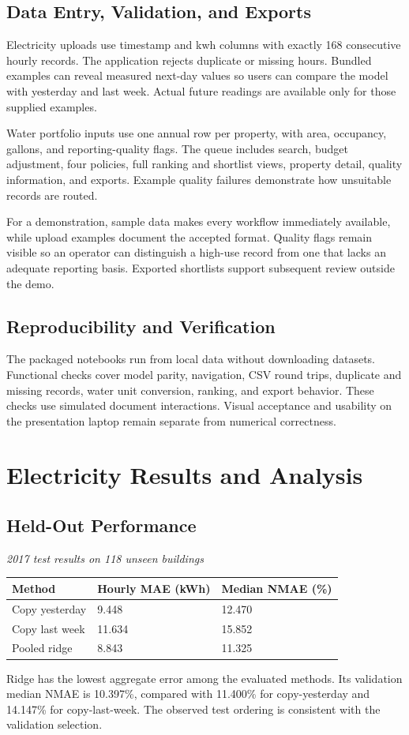 \documentclass[12pt,a4paper]{article}
\begin{document}
\subsection{Data Entry, Validation, and Exports}
Electricity uploads use timestamp and kwh columns with exactly 168 consecutive hourly records. The application rejects duplicate or missing hours. Bundled examples can reveal measured next-day values so users can compare the model with yesterday and last week. Actual future readings are available only for those supplied examples.

Water portfolio inputs use one annual row per property, with area, occupancy, gallons, and reporting-quality flags. The queue includes search, budget adjustment, four policies, full ranking and shortlist views, property detail, quality information, and exports. Example quality failures demonstrate how unsuitable records are routed.

For a demonstration, sample data makes every workflow immediately available, while upload examples document the accepted format. Quality flags remain visible so an operator can distinguish a high-use record from one that lacks an adequate reporting basis. Exported shortlists support subsequent review outside the demo.

\subsection{Reproducibility and Verification}
The packaged notebooks run from local data without downloading datasets. Functional checks cover model parity, navigation, CSV round trips, duplicate and missing records, water unit conversion, ranking, and export behavior. These checks use simulated document interactions. Visual acceptance and usability on the presentation laptop remain separate from numerical correctness.

\newpage
\section{Electricity Results and Analysis}
\subsection{Held-Out Performance}
\begin{center}\small
\textit{2017 test results on 118 unseen buildings}\par\medskip
\begin{tabularx}{\textwidth}{XXX}
\toprule
\textbf{Method} & \textbf{Hourly MAE (kWh)} & \textbf{Median NMAE (\%)}\\\midrule
Copy yesterday & 9.448 & 12.470\\
Copy last week & 11.634 & 15.852\\
Pooled ridge & 8.843 & 11.325\\
\bottomrule\end{tabularx}\end{center}
Ridge has the lowest aggregate error among the evaluated methods. Its validation median NMAE is 10.397\%, compared with 11.400\% for copy-yesterday and 14.147\% for copy-last-week. The observed test ordering is consistent with the validation selection.
\end{document}
